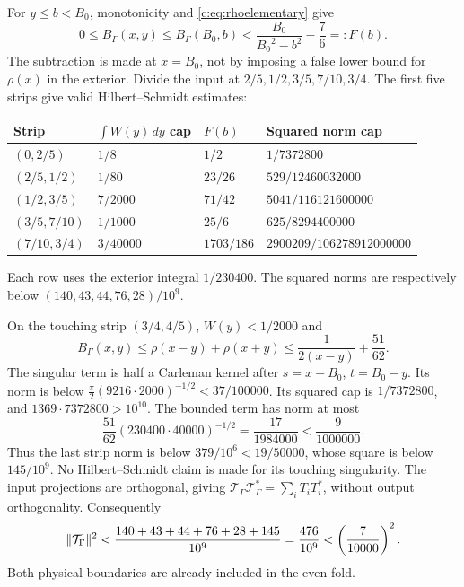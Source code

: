 \documentclass[11pt,a4paper]{article}
\numberwithin{equation}{section}
\theoremstyle{definition}\newtheorem{definition}[theorem]{Definition}
\theoremstyle{remark}\newtheorem{remark}[theorem]{Remark}
\begin{document}
For $y\le b<{B_0}$, monotonicity and \eqref{c:eq:rhoelementary} give
\[
 0\le B_\Gamma(x,y)\le B_\Gamma({B_0},b)
 <\frac{{B_0}}{{B_0}^2-b^2}-\frac76=:F(b).
\]
The subtraction is made at $x={B_0}$, not by imposing a false lower bound for $\rho(x)$ in the exterior.
Divide the input at $2/5,1/2,3/5,7/10,3/4$.
The first five strips give valid Hilbert--Schmidt estimates:
\begin{center}\small
\begin{tabular}{@{}llll@{}}\toprule
Strip & $\int W(y)\,dy$ cap & $F(b)$ & Squared norm cap\\\midrule
$(0,2/5)$ & $1/8$ & $1/2$ & $1/7372800$\\
$(2/5,1/2)$ & $1/80$ & $23/26$ & $529/12460032000$\\
$(1/2,3/5)$ & $7/2000$ & $71/42$ & $5041/116121600000$\\
$(3/5,7/10)$ & $1/1000$ & $25/6$ & $625/8294400000$\\
$(7/10,3/4)$ & $3/40000$ & $1703/186$ & $2900209/106278912000000$\\\bottomrule
\end{tabular}
\end{center}
Each row uses the exterior integral $1/230400$.
The squared norms are respectively below $(140,43,44,76,28)/10^9$.

On the touching strip $(3/4,4/5)$, $W(y)<1/2000$ and
\[
 B_\Gamma(x,y)\le\rho(x-y)+\rho(x+y)
 \le\frac1{2(x-y)}+\frac{51}{62}.
\]
The singular term is half a Carleman kernel after $s=x-{B_0}$, $t={B_0}-y$.
Its norm is below
$\frac\pi2(9216\cdot2000)^{-1/2}<37/100000$.
Its squared cap is $1/7372800$, and $1369\cdot7372800>10^{10}$.
The bounded term has norm at most
\[
 \frac{51}{62}(230400\cdot40000)^{-1/2}
 =\frac{17}{1984000}<\frac9{1000000}.
\]
Thus the last strip norm is below $379/10^6<19/50000$, whose square is below $145/10^9$.
No Hilbert--Schmidt claim is made for its touching singularity.
The input projections are orthogonal, giving
$\mathcal T_\Gamma \mathcal T_\Gamma^*=\sum_iT_iT_i^*$, without output orthogonality.
Consequently
\begin{equation}\label{c:eq:gammaremainnorm}
 \lVert\mathcal T_\Gamma\rVert^2<\frac{140+43+44+76+28+145}{10^9}
 =\frac{476}{10^9}<\left(\frac7{10000}\right)^2.
\end{equation}
Both physical boundaries are already included in the even fold.
\end{document}
